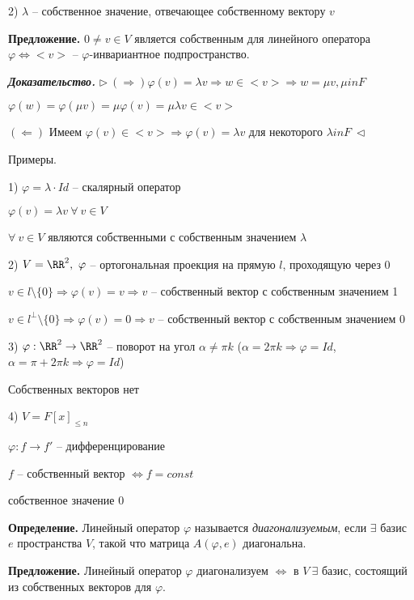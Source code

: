 2) $\lambda$ -- собственное значение, отвечающее собственному вектору $v$

\bigskip
\textbf{Предложение.} $0 \neq v \in V$ является собственным для линейного оператора $\varphi \Leftrightarrow <v>$ -- $\varphi$-инвариантное подпространство.

\bigskip
\textbf{\textit{Доказательство.}} $\rhd \ (\Rightarrow) \varphi(v) = \lambda v \Rightarrow w \in <v> \Rightarrow w = \mu v, \mu in F$

$\varphi(w) = \varphi(\mu v) = \mu \varphi(v) = \mu \lambda v \in <v>$

$(\Leftarrow)$ Имеем $\varphi(v) \in <v> \Rightarrow \varphi(v) = \lambda v$ для некоторого $\lambda in F \ \lhd$

\bigskip
Примеры.

1) $\varphi = \lambda \cdot Id$ -- скалярный оператор

$\varphi(v) = \lambda v \ \forall \ v \in V$

$\forall \ v \in V$ являются собственными с собственным значением $\lambda$

2) $V = \RR^2, \ \varphi$ -- ортогональная проекция на прямую $l$, проходящую через 0

$v \in l \setminus \{0\} \Rightarrow \varphi(v) = v \Rightarrow v$ -- собственный вектор с собственным значением 1

$v \in l^{\bot} \setminus \{0\} \Rightarrow \varphi(v) = 0 \Rightarrow v$ -- собственный вектор с собственным значением 0

3) $\varphi: \RR^2 \rightarrow \RR^2$ -- поворот на угол $\alpha \neq \pi k$ ($\alpha = 2 \pi k \Rightarrow \varphi = Id$, $\alpha = \pi + 2 \pi k \Rightarrow \varphi = Id$)

Собственных векторов нет

4) $V = F[x]_{\leq n}$

$\varphi: f \rightarrow f'$ -- дифференцирование

$f$ -- собственный вектор $\Leftrightarrow f = const$

собственное значение 0

\bigskip
\textbf{Определение.} Линейный оператор $\varphi$ называется \textit{диагонализуемым}, если $\exists$ базис $e$ пространства $V$, такой что матрица $A(\varphi, e)$ диагональна.

\bigskip
\textbf{Предложение.} Линейный оператор $\varphi$ диагонализуем $\Leftrightarrow$ в $V \ \exists$ базис, состоящий из собственных векторов для $\varphi$.


